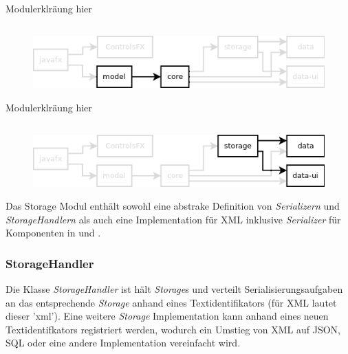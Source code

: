 Modulerklräung hier




\subsection{\textModModel}
\label{\textModModel}
\begin{figure}[h!]
	\centering
	\includegraphics[width=.8\textwidth]{module_dependencies_model.png}
\end{figure}

Modulerklräung hier




\subsection{\textModStorage}
\label{\textModStorage}
\begin{figure}[h!]
	\centering
	\includegraphics[width=.8\textwidth]{module_dependencies_storage.png}
\end{figure}

Das Storage Modul enthält sowohl eine abstrake Definition von \textit{Serializern} und \textit{StorageHandlern}
als auch eine Implementation für XML inklusive \textit{Serializer} für Komponenten in  und
.

\subsubsection{StorageHandler}
Die Klasse \textit{StorageHandler} ist hält \textit{Storage}s und verteilt Serialisierungsaufgaben an
das entsprechende \textit{Storage} anhand eines Textidentifikators (für XML lautet dieser 'xml').
Eine weitere \textit{Storage} Implementation kann anhand eines neuen Textidentifkators registriert werden,
wodurch ein Umstieg von XML auf JSON, SQL oder eine andere Implementation vereinfacht wird.

